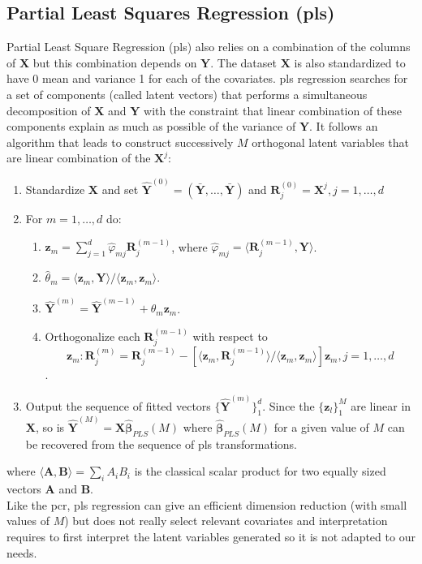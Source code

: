 \documentclass[12pt,a4paper]{report}
\begin{document}
			\subsection{Partial Least Squares Regression ({\sc pls})}

	Partial Least Square Regression ({\sc pls})\cite{abdi2003partial,geladi1986partial} also relies on a combination of the columns of  $\boldsymbol{X}$ but this combination depends on $\boldsymbol{Y}$. The dataset $\boldsymbol{X}$ is also standardized to have 0 mean and variance 1 for each of the covariates. {\sc pls} regression searches for a set
of components (called latent vectors) that performs a simultaneous decomposition of $\boldsymbol{X}$ and $\boldsymbol{Y}$ with the constraint that linear combination of these components explain as much as possible of the variance of $\boldsymbol{Y}$. It follows an algorithm that leads to construct successively $M$ orthogonal latent variables that are linear combination of the $\boldsymbol{X}^j$:
\begin{enumerate}
	\item Standardize $\boldsymbol{X}$ and set $\hat{\boldsymbol{Y}}^{(0)} 
	=(\bar{\boldsymbol{Y}},\dots,\bar{\boldsymbol{Y}})$ and $\boldsymbol{R}_j^{(0)}=\boldsymbol{X}^j,j=1,\dots,d$
	\item For $m=1,\dots,d$ do:
	\begin{enumerate}
		\item $\boldsymbol{z}_m=\sum_{j=1}^d \hat{\varphi}_{mj}\boldsymbol{R}_j^{(m-1)}$, where $\hat{\varphi}_{mj}=\langle \boldsymbol{R}_j^{(m-1)},\boldsymbol{Y}\rangle$.
		\item $\hat{\theta}_m= \langle \boldsymbol{z}_m,\boldsymbol{Y} \rangle / \langle \boldsymbol{z}_m,\boldsymbol{z}_m \rangle$.
		\item $\hat{\boldsymbol{Y}}^{(m)} =\hat{\boldsymbol{Y}}^{(m-1)}+\hat{\theta}_m\boldsymbol{z}_m$.
		\item Orthogonalize each $\boldsymbol{R}_j^{(m-1)}$ with respect to $$\boldsymbol{z}_m: \boldsymbol{R}_j^{(m)}=\boldsymbol{R}_j^{(m-1)}-\left[ \langle \boldsymbol{z}_m,\boldsymbol{R}_j^{(m-1)} \rangle/ \langle \boldsymbol{z}_m,\boldsymbol{z}_m \rangle \right]\boldsymbol{z}_m, j=1,\dots,d$$.
	\end{enumerate}
	\item Output the sequence of fitted vectors $\{\hat{\boldsymbol{Y}}^{(m)}\}_1^d$. Since the $\{ \boldsymbol{z}_l\}_1^M$ are linear in $\boldsymbol{X}$, so is $\hat{\boldsymbol{Y}}^{(M)}=\boldsymbol{X}\hat{\boldsymbol{\beta}}_{PLS}(M)$ where $\hat{\boldsymbol{\beta}}_{PLS}(M)$ for a given value of $M$ can be recovered from the sequence of {\sc pls} transformations.
\end{enumerate}
where $\langle \boldsymbol{A},\boldsymbol{B} \rangle=\sum_i A_iB_i$ is the classical scalar product for two equally sized vectors $\boldsymbol{A}$ and $\boldsymbol{B}$.\\
Like the {\sc pcr}, {\sc pls} regression can give an efficient dimension reduction (with small values of $M$) but does not really select relevant covariates and interpretation requires to first interpret the latent variables generated so it is not adapted to our needs.
\end{document}
